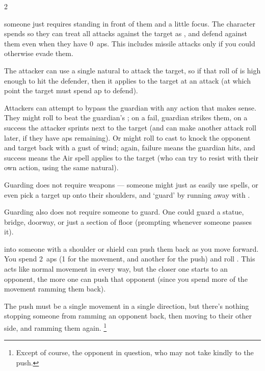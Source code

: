\begin{multicols}{2}
\guardCommentary

someone just requires standing in front of them and a little focus.
The character spends  so they can treat all attacks against the target as , and defend against them even when they have 0~\glspl{ap}.
This includes missile attacks only if you could otherwise evade them.

The attacker can use a single \gls{natural} to attack the target, so if that roll of  is high enough to hit the defender, then it applies to the target at an attack (at which point the target must spend \gls{ap} to defend).

Attackers can attempt to bypass the guardian with any \gls{action} that makes sense.
They might roll  to beat the guardian's ; on a fail, guardian strikes them, on a success the attacker sprints next to the target (and can make another attack roll later, if they have \glspl{ap} remaining).
Or  might roll  to cast  to knock the opponent and target back with a gust of wind; again, failure means the guardian hits, and success means the Air \gls{spell} applies to the target (who can try to resist with their own action, using the same \gls{natural}).

Guarding does not require \glspl{weapon} --- someone might just as easily use \glspl{spell}, or even pick a target up onto their shoulders, and `guard' by running away with .

Guarding also does not require someone to guard.
One could guard a statue, bridge, doorway, or just a section of floor (prompting  whenever someone passes it).

into someone with a shoulder or shield can push them back as you move forward.
You spend 2~\glspl{ap} (1 for the movement, and another for the push) and roll .
This acts like normal movement in every way, but the closer one starts to an opponent, the more one can push that opponent (since you spend more of the movement ramming them back).

The push must be a single movement in a single direction, but there's nothing stopping someone from ramming an opponent back, then moving to their other side, and ramming them again.%
\footnote{Except of course, the opponent in question, who may not take kindly to the push.}


\end{multicols}

